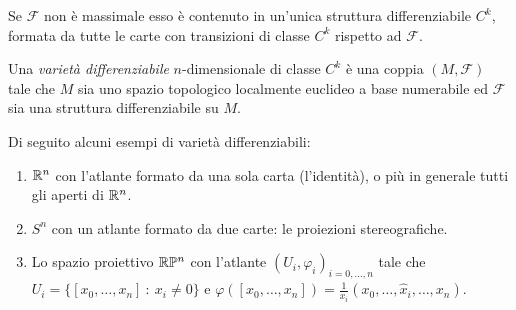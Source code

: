  \begin{remark}
  Se $\mathcal F$ non è massimale esso è contenuto in un'unica struttura differenziabile $C^k$,
  formata da tutte le carte con transizioni di classe $C^k$ rispetto ad $\mathcal F$.
 \end{remark}
 
 \begin{definition} 
  Una \emph{varietà differenziabile} $n$-dimensionale di classe $C^k$ è una coppia $(M, \mathcal F)$ tale che $M$ sia uno spazio topologico localmente euclideo a base numerabile ed $\mathcal F$ sia una struttura differenziabile su $M$.
 \end{definition}
 
\begin{example}
	Di seguito alcuni esempi di varietà differenziabili: 
  \begin{enumerate}
   \item $\mathbb R^n$ con l'atlante formato da una sola carta (l'identità), o più in generale tutti gli aperti di $\mathbb R^n$.
   \item $S^n$ con un atlante formato da due carte: le proiezioni stereografiche.
   \item Lo spazio proiettivo $\mathbb R\mathbb P^n$ con l'atlante $(U_i,\varphi_i)_{i=0,\dots,n}$ tale che $U_i=\{ [x_0,\dots,x_n]\ :\ x_i\neq 0\}$ e $\varphi([x_0,\dots,x_n])=\frac 1{x_i}(x_0,\dots,\hat x_i,\dots,x_n)$.
  \end{enumerate}
 \end{example}
 
